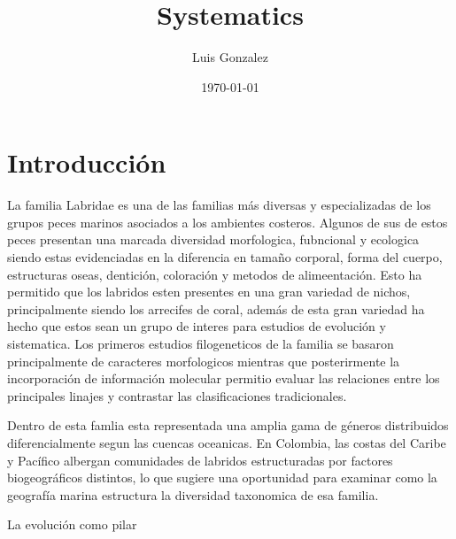 \documentclass[12pt]{article}
\title{Systematics}
\author{Luis Gonzalez}
\date{\today}
\begin{document}
\maketitle

\section{Introducción}
La familia Labridae es una de las familias más diversas y especializadas de los grupos peces marinos asociados a los ambientes costeros. Algunos de sus de estos peces presentan una marcada diversidad morfologica, fubncional y ecologica siendo estas evidenciadas en la diferencia en tamaño corporal, forma del cuerpo, estructuras oseas, dentición, coloración y metodos de alimeentación. Esto ha permitido que los labridos esten presentes en una gran variedad de nichos, principalmente siendo los arrecifes de coral, además de esta gran variedad ha hecho que estos sean un grupo de interes para estudios de evolución y sistematica. Los primeros estudios filogeneticos de la familia se basaron principalmente de caracteres morfologicos mientras que posterirmente la incorporación de información molecular permitio evaluar las relaciones entre los principales linajes y contrastar las clasificaciones tradicionales.

Dentro de esta famlia esta representada una amplia gama de géneros distribuidos diferencialmente segun las cuencas oceanicas. En Colombia, las costas del Caribe y Pacífico albergan comunidades de labridos estructuradas por factores biogeográficos distintos, lo que sugiere una oportunidad para examinar como la geografía marina estructura la diversidad taxonomica de esa familia.

La evolución como pilar 
\end{document}
